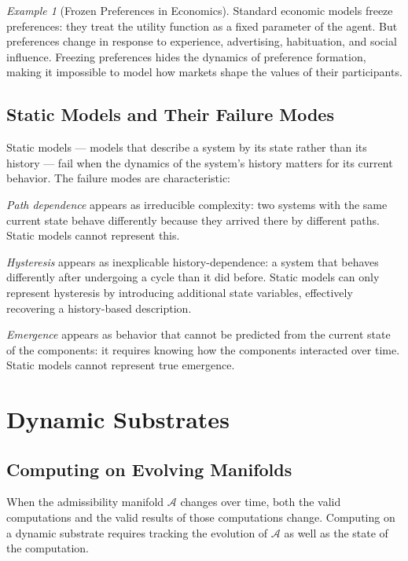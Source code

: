 \documentclass[12pt,a4paper]{book}
\theoremstyle{remark}
\newtheorem{example}{Example}[chapter]
\theoremstyle{definition}
\begin{document}
\begin{example}[Frozen Preferences in Economics]
Standard economic models freeze preferences: they treat the utility
function as a fixed parameter of the agent. But preferences change in
response to experience, advertising, habituation, and social influence.
Freezing preferences hides the dynamics of preference formation, making
it impossible to model how markets shape the values of their participants.
\end{example}

\section{Static Models and Their Failure Modes}

Static models --- models that describe a system by its state rather than
its history --- fail when the dynamics of the system's history matters
for its current behavior. The failure modes are characteristic:

\textit{Path dependence} appears as irreducible complexity: two systems
with the same current state behave differently because they arrived there
by different paths. Static models cannot represent this.

\textit{Hysteresis} appears as inexplicable history-dependence: a system
that behaves differently after undergoing a cycle than it did before.
Static models can only represent hysteresis by introducing additional
state variables, effectively recovering a history-based description.

\textit{Emergence} appears as behavior that cannot be predicted from the
current state of the components: it requires knowing how the components
interacted over time. Static models cannot represent true emergence.

\chapter{Dynamic Substrates}

\section{Computing on Evolving Manifolds}

When the admissibility manifold $\mathcal{A}$ changes over time, both
the valid computations and the valid results of those computations change.
Computing on a dynamic substrate requires tracking the evolution of
$\mathcal{A}$ as well as the state of the computation.
\end{document}
